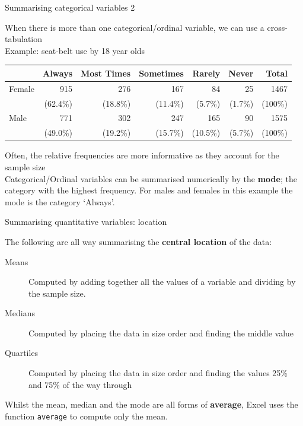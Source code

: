 \documentclass[12pt,xcolor=dvipsnames,handout,mathserif,aspectratio=169]{beamer}
\newcommand{\bbl}[1]{{\color{NavyBlue} \textbf{#1}}}
\newcommand{\bgr}[1]{{\color{PineGreen} \textbf{#1}}}
\begin{document}
\begin{frame}{ Summarising categorical variables 2 }

When there is more than one categorical/ordinal variable, we can use a cross-tabulation\\
\pause
\vspace{0.2cm}
Example: seat-belt use by 18 year olds
\scriptsize
\begin{center}
\begin{tabular}{lrrrrrr}
\hline
 & Always & Most Times & Sometimes & Rarely & Never & Total \\
 \hline
 Female & 915 & 276 & 167 & 84 & 25 & 1467 \\
 & (62.4\%) & (18.8\%) & (11.4\%) & (5.7\%) & (1.7\%) & (100\%) \\
 \hline
 Male & 771 & 302 & 247 & 165 & 90 & 1575 \\
 & (49.0\%) & (19.2\%) & (15.7\%) & (10.5\%) & (5.7\%) & (100\%) \\
 \hline
\end{tabular}
\end{center}
\pause
\normalsize
Often, the relative frequencies are more informative as they account for the sample size \\
\pause
\vspace{0.2cm}
Categorical/Ordinal variables can be summarised numerically by the \bbl{mode}; the category with the highest frequency. For males and females in this example the mode is the category `Always'.
\end{frame}

\begin{frame}{ Summarising quantitative variables: location }

The following are all way summarising the \bbl{central location} of the data:
\vspace{0.5cm}
\begin{description}
\item[Means] Computed by adding together all the values of a variable and dividing by the sample size. 
\item[Medians] Computed by placing the data in size order and finding the middle value
\item[Quartiles] Computed by placing the data in size order and finding the values 25\% and 75\% of the way through
\end{description}
\begin{block}{}
Whilst the mean, median and the mode are all forms of \bgr{average}, Excel uses the function \texttt{average} to compute only the mean.
\end{block}
\end{frame}
\end{document}
